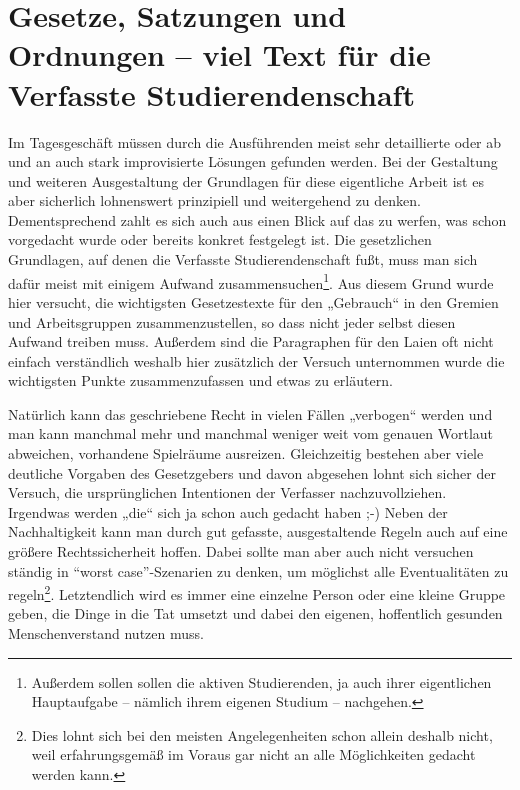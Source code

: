 \documentclass[
10pt,
a4paper,
twoside,								%
titlepage=false,							%
draft=false								%
]{scrartcl}
\begin{document}
\newpage
\vspace*{0.5cm}
\thispagestyle{empty}

\section*{Gesetze, Satzungen und Ordnungen – viel Text für die Verfasste Studierendenschaft}

Im Tagesgeschäft müssen durch die Ausführenden meist sehr detaillierte oder ab und an auch stark improvisierte Lösungen gefunden werden. Bei der Gestaltung und weiteren Ausgestaltung der Grundlagen für diese eigentliche Arbeit ist es aber sicherlich lohnenswert prinzipiell und weitergehend zu denken. Dementsprechend zahlt es sich auch aus einen Blick auf das zu werfen, was schon vorgedacht wurde oder bereits konkret festgelegt ist. Die gesetzlichen Grundlagen, auf denen die Verfasste Studierendenschaft fußt, muss man sich dafür meist mit einigem Aufwand zusammensuchen\footnote{Außerdem sollen sollen die aktiven Studierenden, ja auch ihrer eigentlichen Hauptaufgabe – nämlich ihrem eigenen Studium – nachgehen.}. Aus diesem Grund wurde hier versucht, die wichtigsten Gesetzestexte für den „Gebrauch“ in den Gremien und Arbeitsgruppen zusammenzustellen, so dass nicht jeder selbst diesen Aufwand treiben muss. Außerdem sind die Paragraphen für den Laien oft nicht einfach verständlich weshalb hier zusätzlich der Versuch unternommen wurde die wichtigsten Punkte zusammenzufassen und etwas zu erläutern.

Natürlich kann das geschriebene Recht in vielen Fällen „verbogen“ werden und man kann manchmal mehr und manchmal weniger weit vom genauen Wortlaut abweichen, vorhandene Spielräume ausreizen. Gleichzeitig bestehen aber viele deutliche Vorgaben des Gesetzgebers und davon abgesehen lohnt sich sicher der Versuch, die ursprünglichen Intentionen der Verfasser nachzuvollziehen. Irgendwas werden „die“ sich ja schon auch gedacht haben ;-) Neben der Nachhaltigkeit kann man durch gut gefasste, ausgestaltende Regeln auch auf eine größere Rechtssicherheit hoffen. Dabei sollte man aber auch nicht versuchen ständig in “worst case”-Szenarien zu denken, um möglichst alle Eventualitäten zu regeln\footnote{Dies lohnt sich bei den meisten Angelegenheiten schon allein deshalb nicht, weil erfahrungsgemäß im Voraus gar nicht an alle Möglichkeiten gedacht werden kann.}. Letztendlich wird es immer eine einzelne Person oder eine kleine Gruppe geben, die Dinge in die Tat umsetzt und dabei den eigenen, hoffentlich gesunden Menschenverstand nutzen muss.
\end{document}
